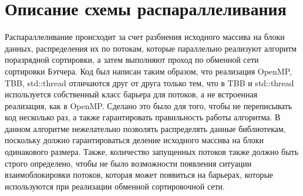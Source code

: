 \documentclass{report}
\begin{document}
\newpage

\section*{Описание схемы распараллеливания}
\par Распараллеливание происходит за счет разбиения исходного массива на блоки данных, распределения их по потокам, которые параллельно реализуют алгоритм поразрядной сортировки, а затем выполняют проход по обменной сети сортировки Бэтчера. Код был написан таким образом, что реализация OpenMP, TBB, std::thread отличаются друг от друга только тем, что в TBB и std::thread используется собственный класс барьера для потоков, а не встроенная реализация, как в OpenMP. Сделано это было для того, чтобы не переписывать код несколько раз, а также гарантировать правильность работы алгоритма. В данном алгоритме нежелательно позволять распределять данные библиотекам, поскольку должно гарантироваться деление исходного массива на блоки одинакового размера. Также, количество запущенных потоков также должно быть строго определено, чтобы не было возможности появления ситуации взаимоблокировки потоков, которая может появиться на барьерах, которые используются при реализации обменной сортировочной сети.

\newpage

\end{document}
